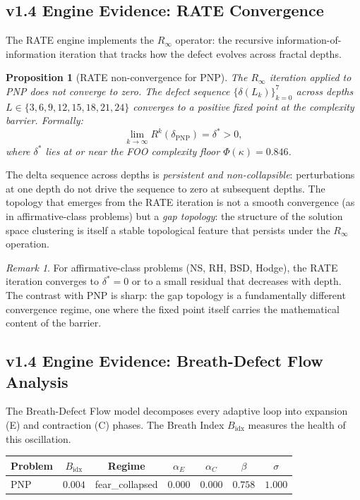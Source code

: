\documentclass[11pt]{article}
\newtheorem{proposition}[theorem]{Proposition}
\theoremstyle{definition}
\theoremstyle{remark}
\newtheorem{remark}[theorem]{Remark}
\begin{document}
\subsection{v1.4 Engine Evidence: RATE Convergence}
\label{sec:rate-pnp}

The RATE engine implements the $R_\infty$ operator: the recursive
information-of-information iteration that tracks how the defect evolves
across fractal depths.

\begin{proposition}[RATE non-convergence for PNP]
\label{prop:rate-pnp}
The $R_\infty$ iteration applied to PNP does \emph{not} converge to zero.
The defect sequence $\{\delta(L_k)\}_{k=0}^{7}$ across depths
$L \in \{3, 6, 9, 12, 15, 18, 21, 24\}$ converges to a positive fixed point
at the complexity barrier.  Formally:
\[
  \lim_{k \to \infty} R^k(\delta_{\mathrm{PNP}}) = \delta^* > 0,
\]
where $\delta^*$ lies at or near the FOO complexity floor $\Phi(\kappa) = 0.846$.
\end{proposition}

\noindent
The delta sequence across depths is \emph{persistent and non-collapsible}:
perturbations at one depth do not drive the sequence to zero at subsequent
depths.  The topology that emerges from the RATE iteration is not a smooth
convergence (as in affirmative-class problems) but a \emph{gap topology}:
the structure of the solution space clustering is itself a stable
topological feature that persists under the $R_\infty$ operation.

\begin{remark}
For affirmative-class problems (NS, RH, BSD, Hodge), the RATE iteration
converges to $\delta^* = 0$ or to a small residual that decreases with
depth.  The contrast with PNP is sharp: the gap topology is a fundamentally
different convergence regime, one where the fixed point itself carries the
mathematical content of the barrier.
\end{remark}

\subsection{v1.4 Engine Evidence: Breath-Defect Flow Analysis}
\label{sec:breath-pnp}

The Breath-Defect Flow model decomposes every adaptive loop into expansion
(E) and contraction (C) phases.  The Breath Index $B_{\mathrm{idx}}$ measures
the health of this oscillation.

\begin{center}
\begin{tabular}{@{}lcccccc@{}}
\toprule
\textbf{Problem} & $B_{\mathrm{idx}}$ & \textbf{Regime} & $\alpha_E$ & $\alpha_C$ & $\beta$ & $\sigma$ \\
\midrule
PNP & $0.004$ & fear\_collapsed & $0.000$ & $0.000$ & $0.758$ & $1.000$ \\
\bottomrule
\end{tabular}
\end{center}
\end{document}
